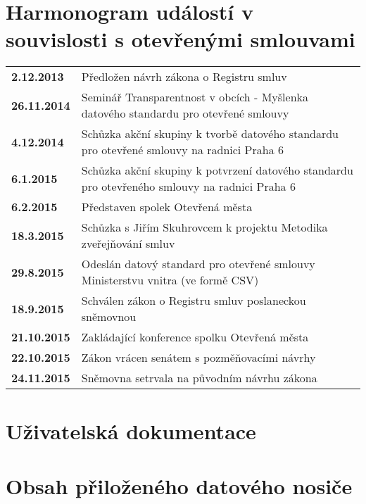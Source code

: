 
\section*{Harmonogram událostí v souvislosti s otevřenými smlouvami}

\begin{table}[h]
\begin{tabular}{lp{120mm}}
\textbf{2.12.2013} & Předložen návrh zákona o Registru smluv \\
\textbf{26.11.2014} & Seminář Transparentnost v obcích - Myšlenka datového standardu pro otevřené smlouvy \\
\textbf{4.12.2014} & Schůzka akční skupiny k tvorbě datového standardu pro otevřené smlouvy na radnici Praha 6 \\
\textbf{6.1.2015} & Schůzka akční skupiny k potvrzení datového standardu pro otevřeného smlouvy na radnici Praha 6 \\
\textbf{6.2.2015} & Představen spolek Otevřená města \\
\textbf{18.3.2015} & Schůzka s Jiřím Skuhrovcem k projektu Metodika zveřejňování smluv \\
\textbf{29.8.2015} & Odeslán datový standard pro otevřené smlouvy Ministerstvu vnitra (ve formě CSV) \\
\textbf{18.9.2015} & Schválen zákon o Registru smluv poslaneckou sněmovnou  \\
\textbf{21.10.2015} & Zakládající konference spolku Otevřená města  \\
\textbf{22.10.2015} & Zákon vrácen senátem s pozměňovacími návrhy  \\
\textbf{24.11.2015} & Sněmovna setrvala na původním návrhu zákona \\
\end{tabular}
\end{table}


\section*{Uživatelská dokumentace}


\section*{Obsah přiloženého datového nosiče}

